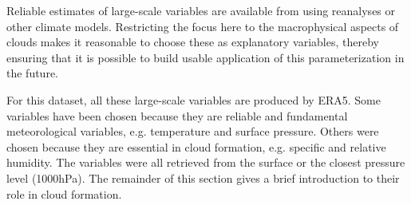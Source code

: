 Reliable estimates of large-scale variables are available from using reanalyses or other climate models. Restricting the focus here to the macrophysical aspects of clouds makes it reasonable to choose these as explanatory variables, thereby ensuring that it is possible to build usable application of this parameterization in the future.

For this dataset, all these large-scale variables are produced by ERA5. Some variables have been chosen because they are reliable and fundamental meteorological variables, e.g. temperature and surface pressure. Others were chosen because they are essential in cloud formation, e.g. specific and relative humidity. The variables were all retrieved from the surface or the closest pressure level (1000hPa). The remainder of this section gives a brief introduction to their role in cloud formation. %

